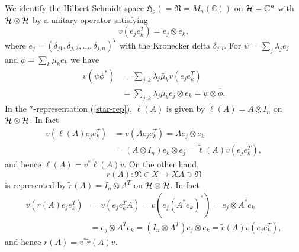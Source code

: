 \documentclass{article}
\begin{document}
 We identify the Hilbert-Schmidt space $\mathfrak{H}_2(=\mathfrak{N}=M_n(\mathbb{C}))$ on ${\cal H}=\mathbb{C}^n$ with $\cal{H}\otimes\cal{H}$
by a unitary operator satisfying 
$$
v(e_je_k^T)=e_j\otimes e_k,
$$
where $e_j=(\delta_{j1},\delta_{j,2},...,\delta_{j,n})^T$ with the Kronecker delta $\delta_{j,l}$. 
For $\psi=\sum_j \lambda_j e_j$ and $\phi=\sum_k \mu_k e_k$
we have
\begin{equation}
\begin{split}
v(\psi\phi^\ast)&=\sum_{j,k}\lambda_j\bar{\mu}_k v(e_je_k^T)\\
&=\sum_{j,k}\lambda_j\bar{\mu}_k e_j\otimes e_k={\psi}\otimes \overline{\phi}.
\end{split}
\end{equation}
In the $\ast$-representation (\ref{star-rep}), $\ell(A)$ is given by $\tilde{\ell}(A)=A\otimes I_n$ on $\cal{H}\otimes\cal{H}$.
In fact
 \begin{equation}
 \begin{split}
 v(\ell(A)e_je_k^T)&=v(Ae_je_k^T)=Ae_j\otimes e_k\\
 &= (A\otimes I_n)e_k\otimes  e_j=\tilde{\ell}(A)v(e_je_k^T),
 \end{split} 
 \end{equation}
 and hence $\ell(A)=v^{\ast}\tilde{\ell}(A)v$. 
On the other hand, 
$$
r(A):\mathfrak{N}\in X \to XA\ni\mathfrak{N}
$$ 
is represented by $\tilde{r}(A)=I_n\otimes A^T$ on $\cal{H}\otimes\cal{H}$.
In fact
 \begin{equation}
 \begin{split}
 v(r(A)e_je_k^T)&=v(e_je_k^TA)=v(e_j(A^\ast e_k)^\ast)=e_j\otimes \overline{A^\ast e_k}\\
 &= e_j \otimes A^T e_k= (I_n\otimes A^T)e_j\otimes  e_k=\tilde{r}(A)v(e_je_k^T),
 \end{split} 
 \end{equation}
 and hence $r(A)=v^{\ast}\tilde{r}(A) v$. 
\end{document}
